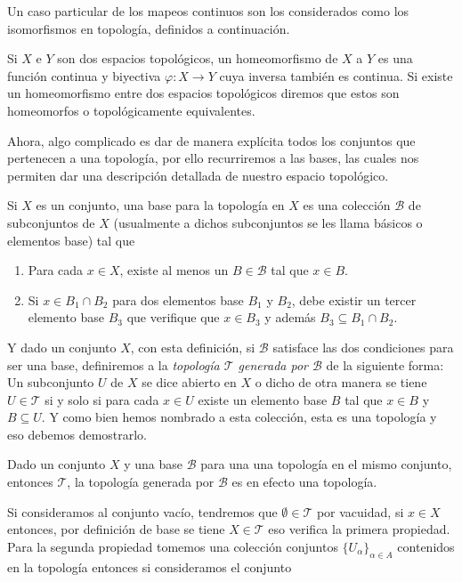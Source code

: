 \documentclass[oneside,11pt]{memoir}
\begin{document}
Un caso particular de los mapeos continuos son los considerados como los isomorfismos en topología, definidos a continuación.
\begin{definition}
    Si $X$ e $Y$ son dos espacios topológicos, un homeomorfismo de $X$ a $Y$ es una función continua y biyectiva $\varphi:X\to Y$ cuya inversa también es continua. Si existe un homeomorfismo entre dos espacios topológicos diremos que estos son homeomorfos o topológicamente equivalentes. 
\end{definition}
Ahora, algo complicado es dar de manera explícita todos los conjuntos que pertenecen a una topología, por ello recurriremos a las bases, las cuales nos permiten dar una descripción detallada de nuestro espacio topológico.
\begin{definition}
    Si $X$ es un conjunto, una base para la topología en $X$ es una colección $\mathcal{B}$ de subconjuntos de $X$ (usualmente a dichos subconjuntos se les llama básicos o elementos base) tal que
    \begin{enumerate}
        \item Para cada $x\in X$, existe al menos un $B\in \mathcal{B}$ tal que $x\in B$.
        \item  Si $x\in B_1\cap B_2$ para dos elementos base $B_1$ y $B_2$, debe existir un tercer elemento base $B_3$ que verifique que $x\in B_3$ y además $B_3\subseteq B_1\cap B_2$.
    \end{enumerate}
\end{definition}
Y dado un conjunto $X$, con esta definición, si $\mathcal{B}$ satisface las dos condiciones para ser una base, definiremos a la \textit{topología $\mathcal{T}$ generada por $\mathcal{B}$} de la siguiente forma: Un subconjunto $U$ de $X$ se dice abierto en $X$ o dicho de otra manera se tiene $U\in \mathcal{T}$ si y solo si para cada $x\in U$ existe un elemento base $B$ tal que $x\in B$ y $B\subseteq U$. Y como bien hemos nombrado a esta colección, esta es una topología y eso debemos demostrarlo. 
\begin{theorem}
Dado un conjunto $X$ y una base $\mathcal{B}$ para una una topología en el mismo conjunto, entonces $\mathcal{T}$, la topología generada por $\mathcal{B}$ es en efecto una topología.
\end{theorem}
Si consideramos al conjunto vacío, tendremos que $\emptyset\in \mathcal{T}$ por vacuidad, si $x\in X$ entonces, por definición de base se tiene $X\in \mathcal{T}$ eso verifica la primera propiedad. Para la segunda propiedad tomemos una colección conjuntos $\{U_\alpha\}_{\alpha\in A}$ contenidos en la topología entonces si consideramos el conjunto
\end{document}
